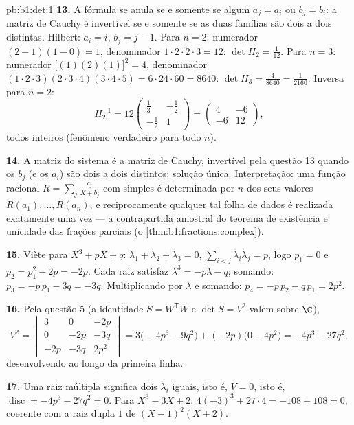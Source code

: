\begin{solution}{pb:b1:det:1}
\textbf{13.} A fórmula se anula se e somente se algum $a_j = a_i$ ou
$b_j =
b_i$: a matriz de Cauchy é invertível se e somente se as duas
famílias são dois a dois distintas. Hilbert: $a_i = i$, $b_j = j - 1$. Para
$n = 2$: numerador $(2-1)(1-0) = 1$, denominador $1\cdot2\cdot2\cdot3
= 12$: $\det H_2 = \frac1{12}$. Para $n = 3$:
numerador $\bigl[(1)(2)(1)\bigr]^2 = 4$, denominador $(1\cdot2\cdot3)
(2\cdot3\cdot4)(3\cdot4\cdot5) = 6\cdot24\cdot60 = 8640$: $\det H_3 = \frac{4}{8640} = \frac1{2160}$. Inversa para $n = 2$:
\[
H_2^{-1} = 12\begin{pmatrix} \frac13 & -\frac12\\[2pt]
-\frac12 & 1\end{pmatrix}
= \begin{pmatrix} 4 & -6\\ -6 & 12 \end{pmatrix},
\]
todos inteiros (fenômeno verdadeiro para todo $n$).

\textbf{14.} A matriz do sistema é a matriz de Cauchy, invertível
pela questão 13 quando os $b_j$ (e os $a_i$) são dois a dois
distintos: solução única. Interpretação: uma função racional $R = \sum_j \frac{c_j}{X + b_j}$
com  simples é determinada por $n$ dos seus valores $R(a_1), \dots, R(a_n)$, e
reciprocamente qualquer tal folha de dados é realizada exatamente
uma vez --- a contrapartida amostral do teorema de existência e
unicidade das frações parciais (o \cref{thm:b1:fractions:complex}).

\textbf{15.} Viète para $X^3 + pX + q$: $\lambda_1 + \lambda_2 +
\lambda_3 = 0$, $\sum_{i<j}\lambda_i\lambda_j = p$, logo $p_1 = 0$ e $p_2 = p_1^2 - 2p = -2p$.
Cada raiz satisfaz $\lambda^3 =
-p\lambda - q$; somando: $p_3 = -p\,p_1 - 3q = -3q$. Multiplicando por
$\lambda$ e somando: $p_4 = -p\,p_2 - q\,p_1 = 2p^2$.

\textbf{16.} Pela questão 5 (a identidade $S = W^{\mathsf T}W$ e $\det S = V^2$ valem sobre
$\C$),
\[
V^2 = \begin{vmatrix}
3 & 0 & -2p\\
0 & -2p & -3q\\
-2p & -3q & 2p^2
\end{vmatrix}
= 3\bigl(-4p^3 - 9q^2\bigr) + (-2p)\bigl(0 - 4p^2\bigr)
= -4p^3 - 27q^2 ,
\]
desenvolvendo ao longo da primeira linha.

\textbf{17.} Uma raiz múltipla significa dois $\lambda_i$ iguais, isto é,
$V = 0$, isto é, $\operatorname{disc} = -4p^3 - 27q^2 = 0$. Para $X^3 - 3X + 2$: $4(-3)^3 + 27\cdot4 = -108 + 108 = 0$, coerente com a raiz dupla
$1$ de $(X-1)^2(X+2)$.


\end{solution}

